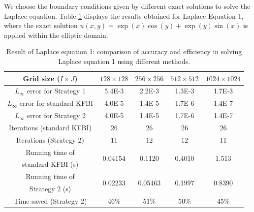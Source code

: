 \documentclass{article}
\begin{document}
We choose the boundary conditions given by different exact solutions to solve the Laplace equation. Table \ref{label1_1_1} displays the results obtained for Laplace Equation 1, where the exact solution \(u(x, y) = \exp(x) \cos(y) + \exp(y) \sin(x)\) is applied within the elliptic domain.
\begin{table}[ht]
    \centering
    \begin{tabular}{|c|c|c|c|c|} \hline 
         Grid size ($I\times J$) & $128 \times 128$ & $256 \times 256$ & $512 \times 512$ & $1024 \times 1024$ \\ \hline 
         $L_{\infty}$ error for Strategy 1 & 5.4E-3 & 2.2E-3 & 1.3E-3 & 1.7E-3\\ \hline
         $L_{\infty}$ error for standard KFBI & 4.0E-5 & 1.4E-5 & 1.7E-6 & 1.4E-7\\ \hline
         $L_{\infty}$ error for Strategy 2 & 4.0E-5 & 1.4E-5 & 1.7E-6 & 1.4E-7 \\ \hline
         Iterations (standard KFBI) &  26&  26&  26& 26\\ \hline 
         Iterations (Strategy 2)& 11&  12&  12& 11  \\ \hline
         
         Running time of 
         & \multirow{2}{*}{0.04154\bigstrut}
         & \multirow{2}{*}{0.1120\bigstrut}
         & \multirow{2}{*}{0.4010\bigstrut}
         & \multirow{2}{*}{1.513\bigstrut} \\
         standard KFBI (s) & & & & \\ \hline
         
         Running time of 
         & \multirow{2}{*}{0.02233\bigstrut}
         & \multirow{2}{*}{0.05463\bigstrut}
         & \multirow{2}{*}{0.1997\bigstrut}
         & \multirow{2}{*}{0.8390\bigstrut} \\
         Strategy 2 (s) & & & & \\ \hline
         
         Time saved (Strategy 2) & 46\%& 51\%& 50\%& 45\%\\ \hline
    \end{tabular}
    \caption{Result of Laplace equation 1: comparison of accuracy and efficiency in solving Laplace equation 1 using different methods.}
    \label{label1_1_1}
\end{table}
\end{document}
